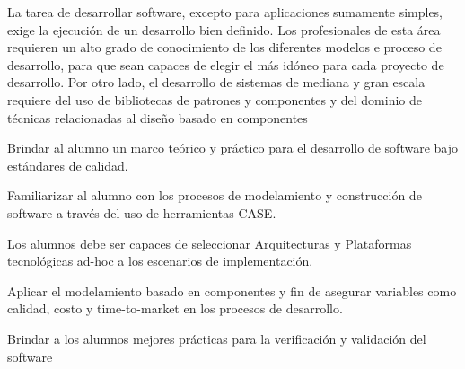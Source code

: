 \begin{syllabus}


\begin{justification}
	La tarea de desarrollar software, excepto para aplicaciones sumamente simples, exige la ejecución de un desarrollo bien definido. Los profesionales de esta área requieren un alto grado de conocimiento de los diferentes modelos e proceso de desarrollo, para que sean capaces de elegir el más idóneo para cada proyecto de desarrollo. Por otro lado, el desarrollo de sistemas de mediana y gran escala requiere del uso de bibliotecas de patrones y componentes y del dominio de técnicas relacionadas al diseño basado en componentes
	\end{justification}
	
	\begin{goals}
	\item Brindar al alumno un marco teórico y práctico para el desarrollo de software bajo estándares de calidad.
	\item Familiarizar al alumno con los procesos de modelamiento y construcción de software a través del uso de herramientas CASE.
	\item Los alumnos debe ser capaces de seleccionar Arquitecturas y Plataformas tecnológicas ad-hoc a los escenarios de implementación.
	\item Aplicar el modelamiento basado en componentes y fin de asegurar variables como calidad, costo y time-to-market en los procesos de desarrollo.
	\item Brindar a los alumnos mejores prácticas para la verificación y validación del software
	\end{goals}
	
	
	

\end{syllabus}
